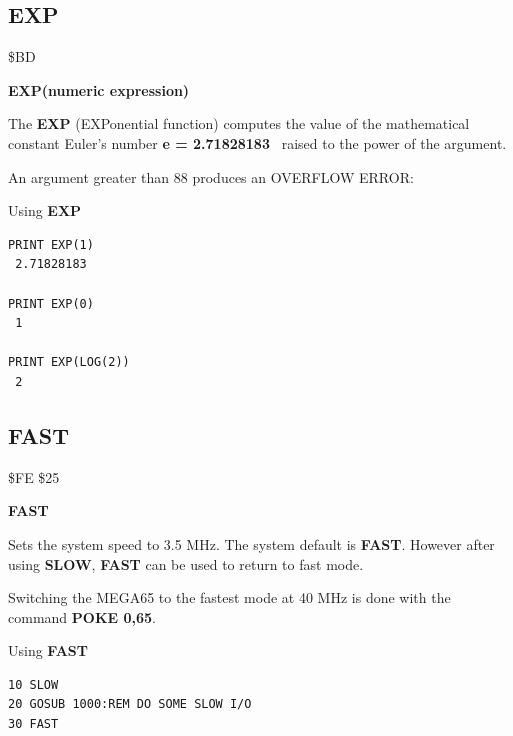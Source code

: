 \subsection{EXP}
\begin{description}[leftmargin=2cm,style=nextline]
\item [Token:] \$BD
\item [Format:] {\bf EXP(numeric expression)}
\item [Usage:] The {\bf EXP} (EXPonential function) computes
               the value of the mathematical constant
               Euler's number {\bf e = 2.71828183}
               raised to the power of the
               argument.

\item [Remarks:] An argument greater than 88 produces
                 an OVERFLOW ERROR:
\item [Example:] Using {\bf EXP}
\begin{tcolorbox}[colback=black,coltext=white]
\verbatimfont{\codefont}
\begin{verbatim}
PRINT EXP(1)
 2.71828183

PRINT EXP(0)
 1

PRINT EXP(LOG(2))
 2
\end{verbatim}
\end{tcolorbox}
\end{description}


\newpage
\subsection{FAST}
\begin{description}[leftmargin=2cm,style=nextline]
\item [Token:] \$FE \$25
\item [Format:] {\bf FAST}
\item [Usage:] Sets the system speed to 3.5 MHz.
               The system default is {\bf FAST}.
               However after using {\bf SLOW}, {\bf FAST} can be used to return
               to fast mode.

\item [Remarks:] Switching the MEGA65 to the fastest mode at 40 MHz
                 is done with the command {\bf POKE 0,65}.

\item [Example:] Using {\bf FAST}
\begin{tcolorbox}[colback=black,coltext=white]
\verbatimfont{\codefont}
\begin{verbatim}
10 SLOW
20 GOSUB 1000:REM DO SOME SLOW I/O
30 FAST
\end{verbatim}
\end{tcolorbox}
\end{description}

